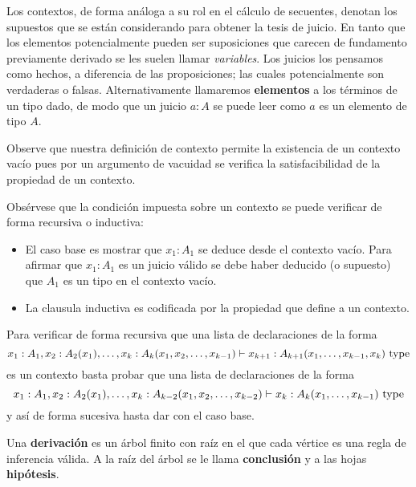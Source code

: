 \documentclass{article}
\begin{document}
        Los contextos, de forma análoga a su rol en el cálculo de secuentes, denotan los supuestos que se están considerando para obtener la tesis de juicio.
        En tanto que los elementos potencialmente pueden ser suposiciones que carecen de fundamento previamente derivado se les suelen llamar \textit{variables}.
        Los juicios los pensamos como hechos, a diferencia de las proposiciones; las cuales potencialmente son verdaderas o falsas.
        Alternativamente llamaremos \textbf{elementos} a los términos de un tipo dado, de modo que un juicio $a : A$ se puede leer como $a$ es un elemento de tipo $A$.
        \begin{remark}
            Observe que nuestra definición de contexto permite la existencia de un contexto vacío pues por un argumento de vacuidad se verifica la
            satisfacibilidad de la propiedad de un contexto.
        \end{remark}
        \begin{remark}
            Obsérvese que la condición impuesta sobre un contexto se puede verificar de forma recursiva o inductiva:
            \begin{itemize}
                \item El caso base es mostrar que $x_1 : A_1$ se deduce desde el contexto vacío. Para afirmar que $x_1 : A_1$ es un juicio válido se debe haber deducido (o supuesto)
                que $A_1$ es un tipo en el contexto vacío.
                \item La clausula inductiva es codificada por la propiedad que define a un contexto.
            \end{itemize}

            Para verificar de forma recursiva que una lista de declaraciones de la forma 
            $$
                x_1 : A_1, x_2 : A_2(x_1), \dots, x_k : A_k(x_1, x_2, \dots, x_{k-1}) \vdash x_{k+1} : A_{k+1}(x_1, \dots, x_{k-1}, x_k)\ \mathrm{type}
            $$
            es un contexto basta probar que una lista de declaraciones de la forma
            $$
            x_1 : A_1, x_2 : A_2(x_1), \dots, x_k : A_{k-2}(x_1, x_2, \dots, x_{k-2}) \vdash x_{k} : A_{k}(x_1, \dots, x_{k-1})\ \mathrm{type}
            $$
            y así de forma sucesiva hasta dar con el caso base.
        \end{remark}

        \begin{definition}[Derivación]
            Una \textbf{derivación} es un árbol finito con raíz en el que cada vértice es una regla de inferencia válida.
            A la raíz del árbol se le llama \textbf{conclusión} y a las hojas \textbf{hipótesis}.
        \end{definition}
\end{document}
